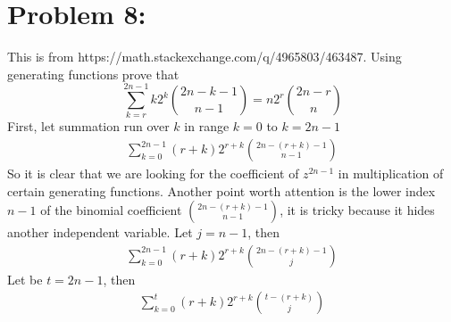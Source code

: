 ﻿\section{Problem 8: }
\label{sec:problem-8}
This is from https://math.stackexchange.com/q/4965803/463487.
Using generating functions prove that
\begin{equation}
    \sum_{k=r}^{2n-1} k2^k \binom{2n-k-1}{n-1} = n2^r \binom{2n-r}{n}
    \label{eq:problem-8}
\end{equation}
First, let summation run over $k$ in range $k=0$ to $k=2n-1$
\begin{align*}
    \sum_{k=0}^{2n-1} (r+k) 2^{r+k} \binom{2n-(r+k)-1}{n-1}
\end{align*}
So it is clear that we are looking for the coefficient of $z^{2n-1}$ in multiplication of certain generating functions.
Another point worth attention is the lower index $n-1$ of the binomial coefficient $\binom{2n-(r+k)-1}{n-1}$,
it is tricky because it hides another independent variable.
Let $j=n-1$, then
\begin{align*}
    \sum_{k=0}^{2n-1} (r+k) 2^{r+k} \binom{2n-(r+k)-1}{j}
\end{align*}
Let be $t=2n-1$, then
\begin{align*}
    \sum_{k=0}^{t} (r+k) 2^{r+k} \binom{t-(r+k)}{j}
\end{align*}
\clearpage
